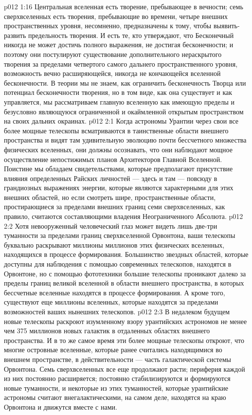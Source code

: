 \vs p012 1:16 Центральная вселенная есть творение, пребывающее в вечности; семь сверхвселенных есть творения, пребывающие во времени, четыре внешних пространственных уровня, несомненно, предназначены к тому, чтобы выявить\hyp{}развить предельность творения. И есть те, кто утверждают, что Бесконечный никогда не может достичь полного выражения, не достигая бесконечности; и поэтому они постулируют существование дополнительного нераскрытого творения за пределами четвертого самого дальнего пространственного уровня, возможность вечно расширяющейся, никогда не кончающейся вселенной бесконечности. В теории мы не знаем, как ограничить бесконечность Творца или потенциал бесконечности творения, но в том виде, как она существует и как управляется, мы рассматриваем главную вселенную как имеющую пределы и безусловно являющуюся ограниченной и окаймленной открытым пространством на своих дальних окраинах.
\vs p012 2:1 Когда астрономы Урантии через свои все более мощные телескопы всматриваются в таинственные области внешнего пространства и видят там удивительную эволюцию почти бессчетного множества физических вселенных, они должны осознавать, что они наблюдают мощное осуществление непостижимых планов Архитекторов Главной Вселенной. Поистине мы обладаем свидетельствами, которые предполагают присутствие влияния определенных Райских личностей --- здесь и там --- повсюду в грандиозных выражениях энергии, которые являются характерными для этих внешних областей, но если смотреть шире, пространственные области, простирающиеся за пределами внешних границ семи сверхвселенных, как правило, считаются составляющими владения Неограниченного Абсолюта.
\vs p012 2:2 Хотя невооруженный человеческий глаз может видеть лишь две\hyp{}три туманности за пределами границ сверхвселенной Орвонтона, ваши телескопы буквально раскрывают миллионы миллионов этих физических вселенных, находящихся в процессе формирования. Большинство звездных областей, которые доступны для наблюдения с помощью современных телескопов, находятся в Орвонтоне, но с помощью фототехники большие телескопы проникают далеко за пределы границ великой вселенной в области внешнего пространства, в которых бессчетные вселенные находятся в процессе формирования. А кроме того, существуют еще миллионы вселенных, которые находятся за пределами возможностей ваших нынешних телескопов.
\vs p012 2:3 В недалеком будущем новые телескопы раскроют изумленному взору урантийских астрономов не менее чем 375 миллионов новых галактик в отдаленных областях внешнего пространства. И в то же самое время эти более мощные телескопы откроют, что многие островные вселенные, которые ранее считались находящимися во внешнем пространстве, в действительности --- часть галактической системы Орвонтона. Семь сверхвселенных все еще продолжают расти; периферия каждой из них постоянно расширяется; постоянно стабилизируются и формируются новые туманности, и некоторые из этих туманностей, которые урантийские астрономы считают внегалактическими, на самом деле, находятся на краю Орвонтона и движутся вместе с нами.
